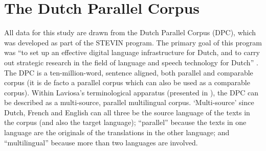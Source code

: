\section{The Dutch Parallel Corpus}
\label{sec:3.3}
All data for this study are drawn from the Dutch Parallel Corpus (DPC), which was developed as part of the STEVIN program. The primary goal of this program was “to set up an effective digital language infrastructure for Dutch, and to carry out strategic research in the field of language and speech technology for Dutch” \citep[1]{Spyns2013}. The DPC is a ten-million-word, sentence aligned, both parallel and comparable corpus (it is de facto a parallel corpus which can also be used as a comparable corpus). Within Laviosa’s terminological apparatus (presented in ), the DPC can be described as a multi-source, parallel multilingual corpus. ‘Multi-source’ since Dutch, French and English can all three be the source language of the texts in the corpus (and also the target language); ``parallel'' because the texts in one language are the originals of the translations in the other language; and ``multilingual'' because more than two languages are involved.

